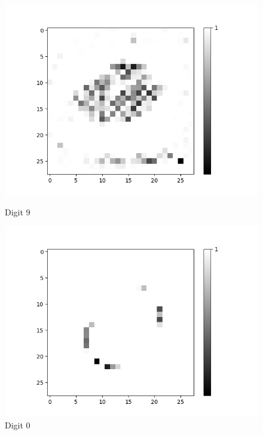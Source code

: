 \begin{figure}[H]
\begin{minipage}[b]{0.19\textwidth}
		\includegraphics[width=\textwidth]{AND-OLD(LSM)/Layer0-Neuron-9.png}
		\caption{Digit 9}
	\end{minipage}
	\hfill
	\begin{minipage}[b]{0.19\textwidth}
		\captionsetup{labelformat=empty}
		\includegraphics[width=\textwidth]{AND-OLD(NO-LSM)/Layer0-Neuron-0.png}
		\caption{Digit 0}
	\end{minipage}
	\begin{minipage}[b]{0.19\textwidth}
		\captionsetup{labelformat=empty}

\end{minipage}
\end{figure}

